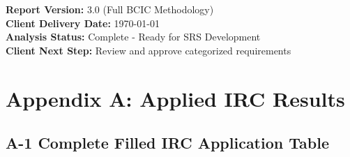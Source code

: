 \documentclass[11pt,a4paper]{article}
\begin{document}
\begin{center}
\textbf{Report Version:} 3.0 (Full BCIC Methodology)\\
\textbf{Client Delivery Date:} \today\\
\textbf{Analysis Status:} Complete - Ready for SRS Development\\
\textbf{Client Next Step:} Review and approve categorized requirements
\end{center}

\newpage
\appendix
\setcounter{page}{1}
\renewcommand{\thepage}{A-\arabic{page}}
\section*{Appendix A: Applied IRC Results}
\label{app:irc-results}

\subsection*{A-1 Complete Filled IRC Application Table}
\end{document}

